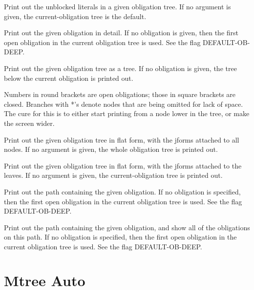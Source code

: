 \begin{description}
\item[POB-LITS]  
Print out the unblocked literals in a given obligation tree.
If no argument is given, the current-obligation tree is the default.

\item[POB-NODE]  
Print out the given obligation in detail. If no 
obligation is given, then the first open obligation 
in the current obligation tree is used. See the flag 
DEFAULT-OB-DEEP.

\item[POTR]  
Print out the given obligation tree as a tree. If no obligation is given,
the tree below the current obligation is printed out. 

Numbers in round brackets are open obligations; those in square brackets are
closed. 
Branches with *'s denote nodes that are being omitted for lack of space.
The cure for this is to either start printing from a node lower in the tree,
or make the screen wider.

\item[POTR*-FLAT]  
Print out the given obligation tree in flat form, 
with the jforms attached to all nodes. If no argument is given,
the whole obligation tree is printed out.

\item[POTR-FLAT]  
Print out the given obligation tree in flat form, 
with the jforms attached to the leaves. If no argument is 
given, the current-obligation tree is printed out.

\item[PPATH]  
Print out the path containing the given obligation.
If no obligation is specified, then the first open obligation 
in the current obligation tree is used. See the flag 
DEFAULT-OB-DEEP.

\item[PPATH*]  
Print out the path containing the given obligation,
and show all of the obligations on this path.
If no obligation is specified, then the first open obligation 
in the current obligation tree is used. See the flag 
DEFAULT-OB-DEEP.
\item
\end{description}

\section{Mtree Auto}

